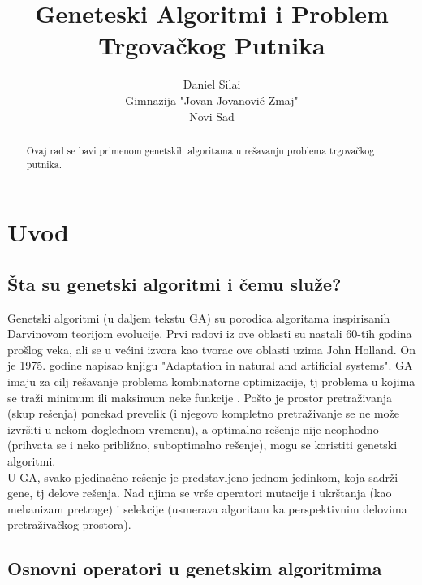 \documentclass[titlepage]{article}
\begin{document}
	\title{\sc Geneteski Algoritmi i Problem Trgova\v{c}kog Putnika}

	\author{Daniel Sila\dj i\\
		Gimnazija "Jovan Jovanovi\'{c} Zmaj"\\
		Novi Sad}
	\maketitle

	\begin{abstract}
		Ovaj rad se bavi primenom genetskih algoritama u re\v{s}avanju problema trgova\v{c}kog putnika. \\
	\end{abstract}

	\section{Uvod}

    	\subsection{\v{S}ta su genetski algoritmi i \v{c}emu slu\v{z}e?}
    		Genetski algoritmi (u daljem tekstu GA) su porodica algoritama inspirisanih Darvinovom teorijom evolucije. Prvi radovi iz ove oblasti su nastali 60-tih godina pro\v{s}log veka, ali se u ve\'{c}ini izvora kao tvorac ove oblasti uzima John Holland. On je 1975. godine napisao knjigu "Adaptation in natural and artificial systems".
        GA imaju za cilj re\v{s}avanje problema kombinatorne optimizacije, tj problema u kojima se tra\v{z}i minimum ili maksimum neke funkcije . Po\v{s}to je prostor pretra\v{z}ivanja (skup re\v{s}enja) ponekad prevelik (i njegovo kompletno pretra\v{z}ivanje se ne mo\v{z}e izvr\v{s}iti u nekom doglednom vremenu), a optimalno re\v{s}enje nije neophodno (prihvata se i neko pribli\v{z}no, suboptimalno re\v{s}enje), mogu se koristiti genetski algoritmi. \\
      U GA, svako pjedina\v{c}no re\v{s}enje je predstavljeno jednom jedinkom, koja sadr\v{z}i gene, tj delove re\v{s}enja. Nad njima se vr\v{s}e operatori mutacije i ukr\v{s}tanja (kao mehanizam pretrage) i selekcije (usmerava algoritam ka perspektivnim delovima pretra\v{z}iva\v{c}kog prostora).

    	\subsection{Osnovni operatori u genetskim algoritmima}
\end{document}
